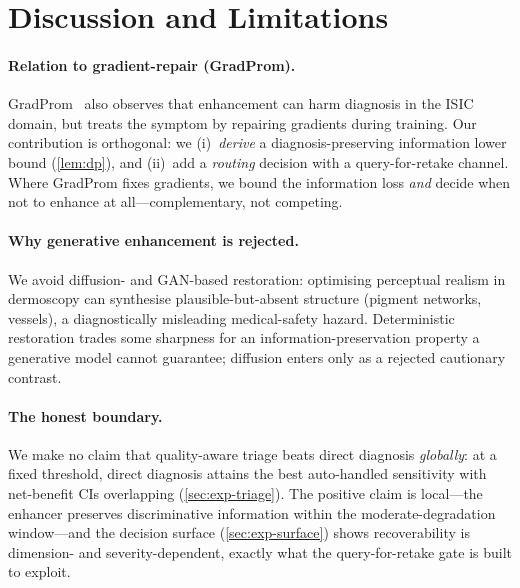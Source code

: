 
\section{Discussion and Limitations}\label{sec:discussion}

\paragraph{Relation to gradient-repair (GradProm).}
GradProm~\citep{gradprom2025} also observes that enhancement can harm diagnosis in
the ISIC domain, but treats the symptom by repairing gradients during training. Our
contribution is orthogonal: we (i)~\emph{derive} a diagnosis-preserving information
lower bound (\cref{lem:dp}), and (ii)~add a \emph{routing} decision
with a query-for-retake channel. Where GradProm fixes gradients, we bound the
information loss \emph{and} decide when not to enhance at all---complementary,
not competing.

\paragraph{Why generative enhancement is rejected.}
We avoid diffusion- and GAN-based restoration: optimising perceptual realism in
dermoscopy can synthesise plausible-but-absent structure (pigment networks, vessels),
a diagnostically misleading medical-safety hazard. Deterministic restoration
trades some sharpness for an information-preservation property a generative model
cannot guarantee; diffusion enters only as a rejected cautionary contrast.

\paragraph{The honest boundary.}
We make no claim that quality-aware triage beats direct diagnosis \emph{globally}: at a
fixed threshold, direct diagnosis attains the best auto-handled sensitivity with
net-benefit CIs overlapping (\cref{sec:exp-triage}). The positive claim is
local---the enhancer preserves discriminative information within the
moderate-degradation window---and the decision surface (\cref{sec:exp-surface}) shows
recoverability is dimension- and severity-dependent, exactly what the query-for-retake
gate is built to exploit.


